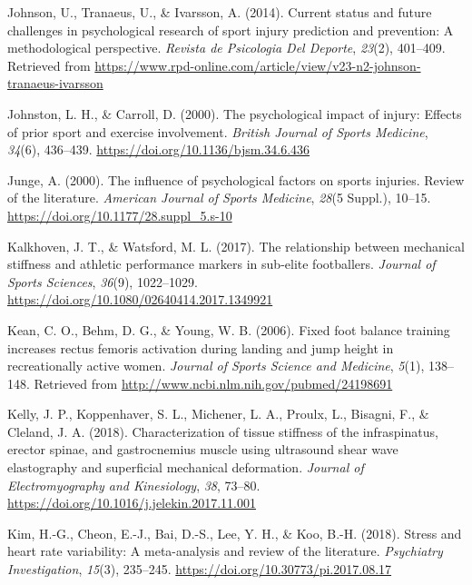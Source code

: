 \documentclass[man,floatsintext]{apa6}
\begin{document}
\leavevmode\hypertarget{ref-Johnson2014}{}%
Johnson, U., Tranaeus, U., \& Ivarsson, A. (2014). Current status and future challenges in psychological research of sport injury prediction and prevention: A methodological perspective. \emph{Revista de Psicologia Del Deporte}, \emph{23}(2), 401--409. Retrieved from \url{https://www.rpd-online.com/article/view/v23-n2-johnson-tranaeus-ivarsson}

\leavevmode\hypertarget{ref-Johnston2000}{}%
Johnston, L. H., \& Carroll, D. (2000). The psychological impact of injury: Effects of prior sport and exercise involvement. \emph{British Journal of Sports Medicine}, \emph{34}(6), 436--439. \url{https://doi.org/10.1136/bjsm.34.6.436}

\leavevmode\hypertarget{ref-Junge2000}{}%
Junge, A. (2000). The influence of psychological factors on sports injuries. Review of the literature. \emph{American Journal of Sports Medicine}, \emph{28}(5 Suppl.), 10--15. \url{https://doi.org/10.1177/28.suppl_5.s-10}

\leavevmode\hypertarget{ref-Kalkhoven2018}{}%
Kalkhoven, J. T., \& Watsford, M. L. (2017). The relationship between mechanical stiffness and athletic performance markers in sub-elite footballers. \emph{Journal of Sports Sciences}, \emph{36}(9), 1022--1029. \url{https://doi.org/10.1080/02640414.2017.1349921}

\leavevmode\hypertarget{ref-Kean2006}{}%
Kean, C. O., Behm, D. G., \& Young, W. B. (2006). Fixed foot balance training increases rectus femoris activation during landing and jump height in recreationally active women. \emph{Journal of Sports Science and Medicine}, \emph{5}(1), 138--148. Retrieved from \url{http://www.ncbi.nlm.nih.gov/pubmed/24198691}

\leavevmode\hypertarget{ref-Kelly2018}{}%
Kelly, J. P., Koppenhaver, S. L., Michener, L. A., Proulx, L., Bisagni, F., \& Cleland, J. A. (2018). Characterization of tissue stiffness of the infraspinatus, erector spinae, and gastrocnemius muscle using ultrasound shear wave elastography and superficial mechanical deformation. \emph{Journal of Electromyography and Kinesiology}, \emph{38}, 73--80. \url{https://doi.org/10.1016/j.jelekin.2017.11.001}

\leavevmode\hypertarget{ref-Kim2018}{}%
Kim, H.-G., Cheon, E.-J., Bai, D.-S., Lee, Y. H., \& Koo, B.-H. (2018). Stress and heart rate variability: A meta-analysis and review of the literature. \emph{Psychiatry Investigation}, \emph{15}(3), 235--245. \url{https://doi.org/10.30773/pi.2017.08.17}
\end{document}
